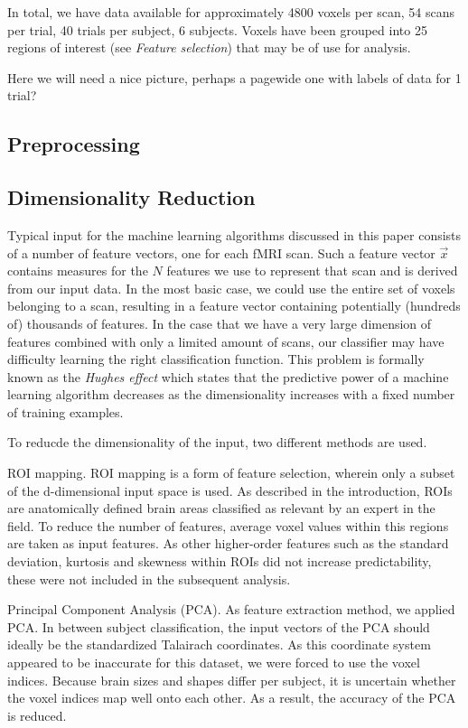 \documentclass[preprint,journal,11pt]{vgtc}
\begin{document}
In total, we have data available for approximately 4800 voxels per scan, 54 scans per trial, 40 trials per subject, 6 subjects. Voxels have been grouped into 25 regions of interest (see \textit{Feature selection}) that may be of use for analysis.

Here we will need a nice picture, perhaps a pagewide one with labels of data for 1 trial?

\subsection{Preprocessing}

\subsection{Dimensionality Reduction}
Typical input for the machine learning algorithms discussed in this paper consists of a number of feature vectors, one for each fMRI scan. Such a feature vector $\vec{x}$ contains measures for the $N$ features we use to represent that scan and is derived from our input data. In the most basic case, we could use the entire set of voxels belonging to a scan, resulting in a feature vector containing potentially (hundreds of) thousands of features.
In the case that we have a very large dimension of features combined with only a limited amount of scans, our classifier may have difficulty learning the right classification function. This problem is formally known as the \textit{Hughes effect}\cite{Hughes1054102} which states that the predictive power of a machine learning algorithm decreases as the dimensionality increases with a fixed number of training examples.

To reducde the dimensionality of the input, two different methods are used.

ROI mapping. ROI mapping is a form of feature selection, wherein only a subset of the d-dimensional input space is used. As described in the introduction, ROIs are anatomically defined brain areas classified as relevant by an expert in the field. To reduce the number of features, average voxel values within this regions are taken as input features. As other higher-order features such as the standard deviation, kurtosis and skewness within ROIs did not increase predictability, these were not included in the subsequent analysis.

Principal Component Analysis (PCA). As feature extraction method, we applied PCA. In between subject classification, the input vectors of the PCA should ideally be the standardized Talairach coordinates. As this coordinate system appeared to be inaccurate for this dataset, we were forced to use the voxel indices. Because brain sizes and shapes differ per subject, it is uncertain whether the voxel indices map well onto each other. As a result, the accuracy of the PCA is reduced.   
\end{document}
